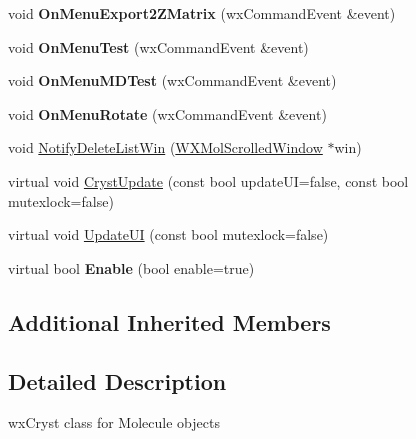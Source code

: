 \begin{DoxyCompactItemize}
\item 
\mbox{\label{class_obj_cryst_1_1_w_x_molecule_a6f8e8e6d48d8ddba22e88c7057e2aa67}} 
void {\bfseries On\+Menu\+Export2\+Z\+Matrix} (wx\+Command\+Event \&event)
\item 
\mbox{\label{class_obj_cryst_1_1_w_x_molecule_ac17b49db6e8c89663229bf3e488f99c0}} 
void {\bfseries On\+Menu\+Test} (wx\+Command\+Event \&event)
\item 
\mbox{\label{class_obj_cryst_1_1_w_x_molecule_a9f6b8fdbf2c224a98103a8a44120db2c}} 
void {\bfseries On\+Menu\+M\+D\+Test} (wx\+Command\+Event \&event)
\item 
\mbox{\label{class_obj_cryst_1_1_w_x_molecule_a9d2d15ae3f047e5c96b7457b0eeb28b0}} 
void {\bfseries On\+Menu\+Rotate} (wx\+Command\+Event \&event)
\item 
void \mbox{\hyperlink{class_obj_cryst_1_1_w_x_molecule_a0f40875a760fc29cb92db426fbdf21ce}{Notify\+Delete\+List\+Win}} (\mbox{\hyperlink{class_obj_cryst_1_1_w_x_mol_scrolled_window}{W\+X\+Mol\+Scrolled\+Window}} $\ast$win)
\item 
virtual void \mbox{\hyperlink{class_obj_cryst_1_1_w_x_molecule_a19b65e2f9b5da859675278ff74f3f5e9}{Cryst\+Update}} (const bool update\+UI=false, const bool mutexlock=false)
\item 
virtual void \mbox{\hyperlink{class_obj_cryst_1_1_w_x_molecule_ac234eca0ea8eb99e4d94387c506f1643}{Update\+UI}} (const bool mutexlock=false)
\item 
\mbox{\label{class_obj_cryst_1_1_w_x_molecule_ab3f94bc97c68b32255cb10e75c1f3c73}} 
virtual bool {\bfseries Enable} (bool enable=true)
\end{DoxyCompactItemize}
\subsection*{Additional Inherited Members}


\subsection{Detailed Description}
wx\+Cryst class for Molecule objects 

